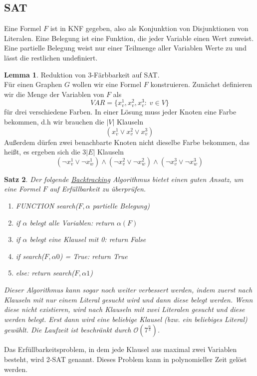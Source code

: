\documentclass[a4paper, 12pt]{article}
\theoremstyle{plain}
\newtheorem{theorem}{Satz}[section] %
\theoremstyle{definition}
\theoremstyle{lemma}
\newtheorem{lemma}[theorem]{Lemma}
\theoremstyle{remark}
\theoremstyle{corollary}
\theoremstyle{example}
\begin{document}
	\subsection{SAT}
	Eine Formel $F$ ist in KNF gegeben, also als Konjunktion von Disjunktionen von Literalen. Eine Belegung ist eine Funktion, die jeder Variable einen Wert zuweist. Eine partielle Belegung weist nur einer Teilmenge aller Variablen Werte zu und lässt die restlichen undefiniert.
	\begin{lemma}
		Reduktion von 3-Färbbarkeit auf SAT.\\
		Für einen Graphen $G$ wollen wir eine Formel $F$ konstruieren. Zunächst definieren wir die Menge der Variablen von $F$ als \[VAR = \{x_v^1, x_v^2, x_v^3: \; v \in V\}\] für drei verschiedene Farben. In einer Lösung muss jeder Knoten eine Farbe bekommen, d.h wir brauchen die $\left|V\right|$ Klauseln \[(x_v^1 \lor x_v^2 \lor x_v^3)\] Außerdem dürfen zwei benachbarte Knoten nicht dieselbe Farbe bekommen, das heißt, es ergeben sich die $3\left|E\right|$ Klauseln \[(\lnot {x_v^1} \lor \lnot {x_w^1}) \land (\lnot {x_v^2} \lor \lnot {x_w^2}) \land (\lnot {x_v^3} \lor \lnot {x_w^3})\] 
	\end{lemma}
	\begin{theorem}
		Der folgende \underline{Backtracking} Algorithmus bietet einen guten Ansatz, um eine Formel $F$ auf Erfüllbarkeit zu überprüfen.
		\begin{enumerate}
			\item FUNCTION search($F, \alpha$ partielle Belegung)
			\item if $\alpha$ belegt alle Variablen: return $\alpha(F)$
			\item if $\alpha$ belegt eine Klausel mit 0: return False
			\item if search($F, \alpha0$) = True: return True
			\item else: return search($F,\alpha1$)
		\end{enumerate}
		Dieser Algorithmus kann sogar noch weiter verbessert werden, indem zuerst nach Klauseln mit nur einem Literal gesucht wird und dann diese belegt werden. Wenn diese nicht existieren, wird nach Klauseln mit zwei Literalen gesucht und diese werden belegt. Erst dann wird eine beliebige Klausel (bzw. ein beliebiges Literal) gewählt. Die Laufzeit ist beschränkt durch $\mathcal{O}(7^{\frac{n}{3}})$.
	\end{theorem}
	Das Erfüllbarkeitsproblem, in dem jede Klausel aus maximal zwei Variablen besteht, wird 2-SAT genannt. Dieses Problem kann in polynomieller Zeit gelöst werden.
\end{document}
